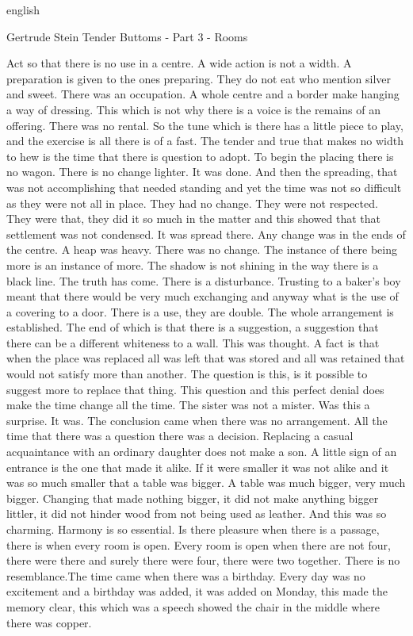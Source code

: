 \begin{otherlanguage*}{english}

 

Gertrude Stein
Tender Buttoms - Part 3 - Rooms

Act so that there is no use in a centre. 
A wide action is not a width. A preparation is given to the ones preparing. They do not eat who mention silver and sweet. There was an occupation.
A whole centre and a border make hanging a way of dressing. This which is not why there is a voice is the remains of an offering. There was no rental.
So the tune which is there has a little piece to play, and the exercise is all there is of a fast. The tender and true that makes no width to hew is the time that there is question to adopt.
To begin the placing there is no wagon. There is no change lighter. It was done. And then the spreading, that was not accomplishing that needed standing and yet the time was not so difficult as they were not all in place. They had no change. They were not respected. They were that, they did it so much in the matter and this showed that that settlement was not condensed. It was spread there. Any change was in the ends of the centre. A heap was heavy. There was no change.
The instance of there being more is an instance of more. The shadow is not shining in the way there is a black line. The truth has come. There is a disturbance. Trusting to a baker's boy meant that there would be very much exchanging and anyway what is the use of a covering to a door. There is a use, they are double.
The whole arrangement is established. The end of which is that there is a suggestion, a suggestion that there can be a different whiteness to a wall. This was thought.
A fact is that when the place was replaced all was left that was stored and all was retained that would not satisfy more than another. The question is this, is it possible to suggest more to replace that thing. This question and this perfect denial does make the time change all the time.
The sister was not a mister. Was this a surprise. It was. The conclusion came when there was no arrangement. All the time that there was a question there was a decision. Replacing a casual acquaintance with an ordinary daughter does not make a son.
A little sign of an entrance is the one that made it alike. If it were smaller it was not alike and it was so much smaller that a table was bigger. A table was much bigger, very much bigger. Changing that made nothing bigger, it did not make anything bigger littler, it did not hinder wood from not being used as leather. And this was so charming. Harmony is so essential. Is there pleasure when there is a passage, there is when every room is open. Every room is open when there are not four, there were there and surely there were four, there were two together. There is no resemblance.The time came when there was a birthday. Every day was no excitement and a birthday was added, it was added on Monday, this made the memory clear, this which was a speech showed the chair in the middle where there was copper.

\end{otherlanguage*}
